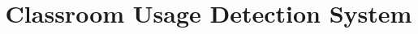 \documentclass{sig-alternate-ipsn13}
\begin{document}
\title{Classroom Usage Detection System}
%
%
%
%
%
\end{document}
